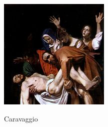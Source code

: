 \begin{figure}[htb]
{  \includegraphics[width=.24\textwidth]{figs/thumbs/caravaggio/18}}\hfill {} \\

  \caption{Caravaggio}
  \label{fig:caravaggio_1}
\end{figure}


